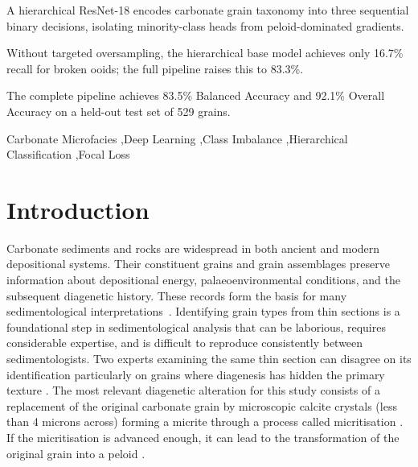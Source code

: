 \documentclass[a4paper,fleqn]{cas-dc}
\begin{document}
\begin{highlights}
\item A hierarchical ResNet-18 encodes carbonate grain taxonomy into three sequential binary decisions, isolating minority-class heads from peloid-dominated gradients.
\item Without targeted oversampling, the hierarchical base model achieves only 16.7\% recall for broken ooids; the full pipeline raises this to 83.3\%.
\item The complete pipeline achieves 83.5\% Balanced Accuracy and 92.1\% Overall Accuracy on a held-out test set of 529 grains.
\end{highlights}

\begin{keywords}
Carbonate Microfacies \sep Deep Learning \sep Class Imbalance \sep Hierarchical Classification \sep Focal Loss
\end{keywords}

\maketitle


\section{Introduction}
Carbonate sediments and rocks are widespread in both ancient and modern depositional systems. Their constituent grains and grain assemblages preserve information about depositional energy, palaeoenvironmental conditions, and the subsequent diagenetic history. These records form the basis for many sedimentological interpretations~\citep{flugel2010}. Identifying grain types from thin sections is a foundational step in sedimentological analysis that can be laborious, requires considerable expertise, and is difficult to reproduce consistently between sedimentologists. Two experts examining the same thin section can disagree on its identification particularly on grains where diagenesis has hidden the primary texture \citep{flugel2010}. The most relevant diagenetic alteration for this study consists of a replacement of the original carbonate grain by microscopic calcite crystals (less than 4 microns across) forming a micrite through a process called micritisation \citep{bathurst1971,flugel2010}. If the micritisation is advanced enough, it can lead to the transformation of the original grain into a peloid \citep{bathurst1971,flugel2010}.
\end{document}
